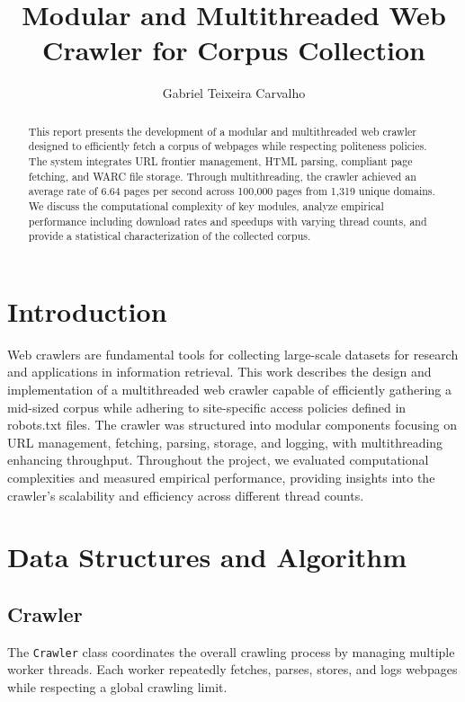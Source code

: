 \documentclass[sigconf]{acmart}
\title{Modular and Multithreaded Web Crawler for Corpus Collection}
\author{Gabriel Teixeira Carvalho}
\affiliation{%
  \institution{Universidade Federal de Minas Gerais}
  \city{Belo Horizonte}
  \state{MG}
  \country{Brazil}
}
\begin{document}
\begin{abstract} 
This report presents the development of a modular and multithreaded web crawler designed to efficiently fetch a corpus of webpages while respecting politeness policies. The system integrates URL frontier management, HTML parsing, compliant page fetching, and WARC file storage. Through multithreading, the crawler achieved an average rate of 6.64 pages per second across 100,000 pages from 1,319 unique domains. We discuss the computational complexity of key modules, analyze empirical performance including download rates and speedups with varying thread counts, and provide a statistical characterization of the collected corpus.
\end{abstract}


\maketitle
{}

\section{Introduction}
Web crawlers are fundamental tools for collecting large-scale datasets for research and applications in information retrieval. This work describes the design and implementation of a multithreaded web crawler capable of efficiently gathering a mid-sized corpus while adhering to site-specific access policies defined in robots.txt files. The crawler was structured into modular components focusing on URL management, fetching, parsing, storage, and logging, with multithreading enhancing throughput. Throughout the project, we evaluated computational complexities and measured empirical performance, providing insights into the crawler's scalability and efficiency across different thread counts.


\section{Data Structures and Algorithm}
\subsection{Crawler}
The \texttt{Crawler} class coordinates the overall crawling process by managing multiple worker threads. Each worker repeatedly fetches, parses, stores, and logs webpages while respecting a global crawling limit.
\end{document}
